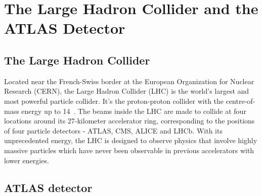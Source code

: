 \chapter{The Large Hadron Collider and the ATLAS Detector}

\section{The Large Hadron Collider}
Located near the French-Swiss border at the European Organization for Nuclear Research (CERN),
the Large Hadron Collider (LHC) is the world's largest and most powerful particle collider.
It's the proton-proton collider with the centre-of-mass energy up to 14~\tev.
The beams inside the LHC are made to collide at four locations around its 27-kilometer accelerator ring, 
corresponding to the positions of four particle detectors - ATLAS, CMS, ALICE and LHCb.
With its unprecedented energy, the LHC is designed to observe physics that involve highly massive particles
which have never been observable in previous accelerators with lower energies.




\section{ATLAS detector}



